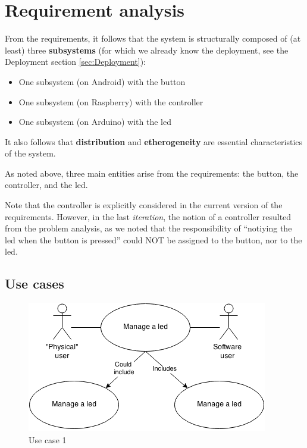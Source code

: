 \documentclass{article}
\newcommand{\labelsec}[1]{\label{sec:#1}}
\newcommand{\labelssec}[1]{\label{ssec:#1}}
\begin{document}
 
\section{Requirement analysis}
\labelsec{ReqAnalysis}

From the requirements, it follows that the system is structurally composed of
(at least) three \textbf{subsystems} (for which we already know the deployment,
see the Deployment section \ref{sec:Deployment}):
 
\begin{itemize}
  \item One subsystem (on Android) with the button
  \item One subsystem (on Raspberry) with the controller
  \item One subsystem (on Arduino) with the led
\end{itemize}

It also follows that \textbf{distribution} and \textbf{etherogeneity} are
essential characteristics of the system.

As noted above, three main entities arise from the requirements: the button,
the controller, and the led.

Note that the controller is explicitly considered in the current version of the
requirements. However, in the last \emph{iteration}, the notion of a controller
resulted from the problem analysis, as we noted that the responsibility of
``notiying the led when the button is pressed'' could NOT be assigned to the
button, nor to the led.


\subsection{Use cases}
\labelssec{UseCases}

\begin{figure}[H]
    \centering
     \includegraphics[scale = 0.6]{img/BLS-UseCase.png}
    \caption{Use case 1}
    \label{fig:usecase1}
\end{figure}
\end{document}
